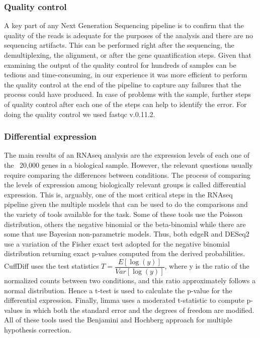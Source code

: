 \subsubsection{Quality control}
A key part of any Next Generation Sequencing pipeline is to confirm that the quality of the reads is adequate for the purposes of the analysis and there are no sequencing artifacts. This can be performed right after the sequencing, the demultiplexing, the alignment, or after the gene quantification steps. Given that examining the output of the quality control for hundreds of samples can be tedious and time-consuming, in our experience it was more efficient to perform the quality control at the end of the pipeline to capture any failures that the process could have produced. In case of problems with the sample, further steps of quality control after each one of the steps can help to identify the error. For doing the quality control we used fastqc v.0.11.2.

\subsubsection{Differential expression}
The main results of an RNAseq analysis are the expression levels of each one of the ~20,000 genes in a biological sample. However, the relevant questions usually require comparing the differences between conditions. The process of comparing the levels of expression among biologically relevant groups is called differential expression. This is, arguably, one of the most critical steps in the RNAseq pipeline given the multiple models that can be used to do the comparisons and the variety of tools available for the task. Some of these tools use the Poisson distribution, others the negative binomial or the beta-binomial while there are some that use Bayesian non-parametric models. Thus, both edgeR and DESeq2 use a variation of the Fisher exact test adopted for the negative binomial distribution returning exact p-values computed from the derived probabilities. CuffDiff uses the test statistics $T=\dfrac{E[\log(y)]}{Var[\log(y)]}$, where y is the ratio of the normalized counts between two conditions, and this ratio approximately follows a normal distribution. Hence a t-test is used to calculate the p-value for the differential expression. Finally, limma uses a moderated t-statistic to compute p-values in which both the standard error and the degrees of freedom are modified. All of these tools used the Benjamini and Hochberg approach for multiple hypothesis correction.\cite{Benjamini1995}

